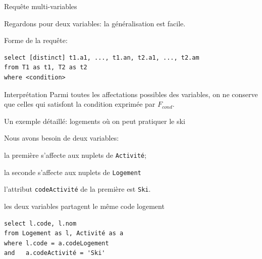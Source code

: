 \begin{frame}[fragile]{Requête multi-variables}

Regardons pour deux variables: la généralisation est facile.

\vfill

Forme de la requête:

\begin{verbatim}
select [distinct] t1.a1, ..., t1.an, t2.a1, ..., t2.am
from T1 as t1, T2 as t2
where <condition>
\end{verbatim}

\vfill
\begin{blocgauche}
\begin{defblock}{Interprétation}
Parmi toutes les affectations possibles des variables, 
on ne conserve que celles qui satisfont la condition exprimée par  $F_{cond}$.
\end{defblock}
\end{blocgauche}

\end{frame}


\begin{frame}[fragile]{Un exemple détaillé: logements où on peut pratiquer le ski}


Nous avons besoin de deux variables:
\begin{redbullet}
   \item la première s’affecte aux nuplets de \texttt{Activité}; 
   \item la seconde s’affecte aux nuplets de \texttt{Logement}
   \item l'attribut \texttt{codeActivité} de la première est \texttt{Ski}.
   \item \alert{les deux variables partagent le même code logement}
\end{redbullet}

\vfill

\begin{verbatim}
select l.code, l.nom
from Logement as l, Activité as a
where l.code = a.codeLogement
and   a.codeActivité = 'Ski'
\end{verbatim}

\end{frame}

